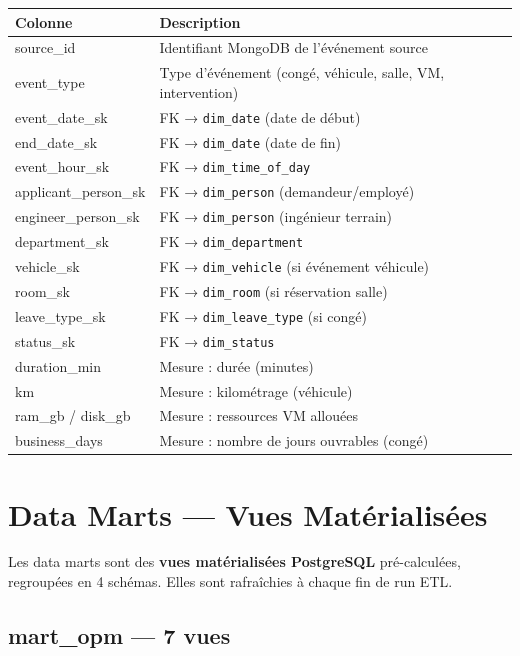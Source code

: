 \documentclass[a4paper,12pt]{article}
\begin{document}
\begin{tabularx}{\textwidth}{>{\ttfamily\footnotesize}p{4.5cm} >{\footnotesize}X}
\toprule
\textbf{Colonne} & \textbf{Description} \\
\midrule
source\_id              & Identifiant MongoDB de l'événement source \\
event\_type             & Type d'événement (congé, véhicule, salle, VM, intervention) \\
event\_date\_sk         & FK → \texttt{dim\_date} (date de début) \\
end\_date\_sk           & FK → \texttt{dim\_date} (date de fin) \\
event\_hour\_sk         & FK → \texttt{dim\_time\_of\_day} \\
applicant\_person\_sk   & FK → \texttt{dim\_person} (demandeur/employé) \\
engineer\_person\_sk    & FK → \texttt{dim\_person} (ingénieur terrain) \\
department\_sk          & FK → \texttt{dim\_department} \\
vehicle\_sk             & FK → \texttt{dim\_vehicle} (si événement véhicule) \\
room\_sk                & FK → \texttt{dim\_room} (si réservation salle) \\
leave\_type\_sk         & FK → \texttt{dim\_leave\_type} (si congé) \\
status\_sk              & FK → \texttt{dim\_status} \\
duration\_min           & Mesure : durée (minutes) \\
km                      & Mesure : kilométrage (véhicule) \\
ram\_gb / disk\_gb      & Mesure : ressources VM allouées \\
business\_days          & Mesure : nombre de jours ouvrables (congé) \\
\bottomrule
\end{tabularx}

\section{Data Marts — Vues Matérialisées}

Les data marts sont des \textbf{vues matérialisées PostgreSQL} pré-calculées,
regroupées en 4 schémas. Elles sont rafraîchies à chaque fin de run ETL.

\subsection{mart\_opm — 7 vues}
\end{document}

